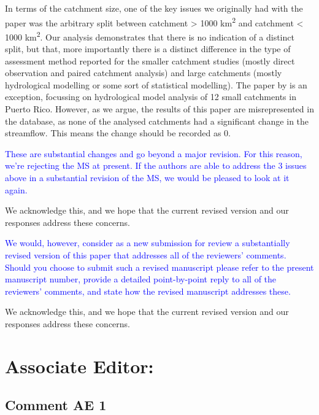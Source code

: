 \documentclass[]{elsarticle} %
\begin{document}
\begin{itemize}
  In terms of the catchment size, one of the key issues we originally had with the \citet{zhang2017} paper was the arbitrary split between catchment \textgreater{} 1000 km\textsuperscript{2} and catchment \textless{} 1000 km\textsuperscript{2}. Our analysis demonstrates that there is no indication of a distinct split, but that, more importantly there is a distinct difference in the type of assessment method reported for the smaller catchment studies (mostly direct observation and paired catchment analysis) and large catchments (mostly hydrological modelling or some sort of statistical modelling). The paper by \citet{beck2013} is an exception, focussing on hydrological model analysis of 12 small catchments in Puerto Rico. However, as we argue, the results of this paper are misrepresented in the database, as none of the analysed catchments had a significant change in the streamflow. This means the change should be recorded as 0.
\end{itemize}

\textcolor{blue}{These are substantial changes and go beyond a major revision.  For this reason, we're rejecting the MS at present.  If the authors are able to address the 3 issues above in a substantial revision of the MS, we would be pleased to look at it again.}

We acknowledge this, and we hope that the current revised version and our responses address these concerns.

\textcolor{blue}{We would, however, consider as a new submission for review a substantially revised version of this paper that addresses all of the reviewers' comments.  Should you choose to submit such a revised manuscript please refer to the present manuscript number, provide a detailed point-by-point reply to all of the reviewers' comments, and state how the revised manuscript addresses these.}

We acknowledge this, and we hope that the current revised version and our responses address these concerns.

\hypertarget{associate-editor}{%
\section{Associate Editor:}\label{associate-editor}}

\hypertarget{comment-ae-1}{%
\subsection{Comment AE 1}\label{comment-ae-1}}
\end{document}
